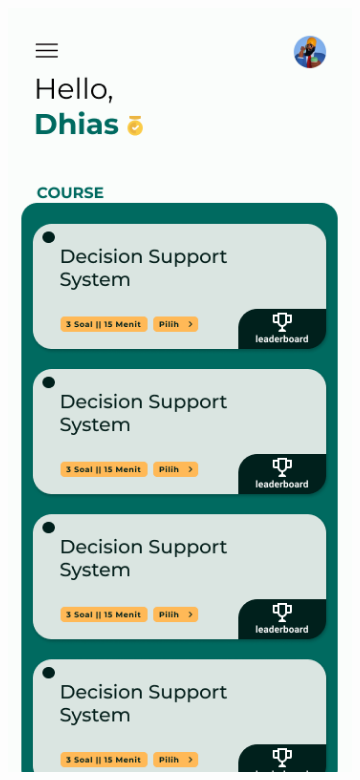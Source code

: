 \begin{figure}[H]
	\centering
	\begin{subfigure}[b]{0.23\textwidth}
		\centering
	  \includegraphics[width=\linewidth]{contents/chapter-3/images/HF-QuizList.png}

\end{subfigure}
\end{figure}
